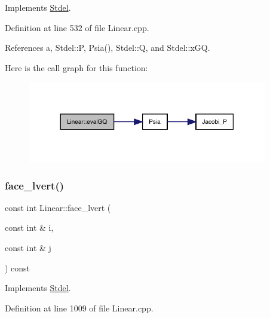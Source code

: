 Implements \hyperlink{classStdel_ae144597c3199b1757a5fbbc255e17baa}{Stdel}.



Definition at line 532 of file Linear.\+cpp.



References a, Stdel\+::P, Psia(), Stdel\+::Q, and Stdel\+::x\+GQ.

Here is the call graph for this function\+:
\nopagebreak
\begin{figure}[H]
\begin{center}
\leavevmode
\includegraphics[width=297pt]{classLinear_a6b7d2f6ffb9cef8e9f6a6f2a8365db60_cgraph}
\end{center}
\end{figure}
\mbox{\label{classLinear_ab27641b2d84128bc1cfaf87f40d5af45}} 
\subsubsection{\texorpdfstring{face\+\_\+lvert()}{face\_lvert()}}
{\footnotesize\ttfamily const int Linear\+::face\+\_\+lvert (\begin{DoxyParamCaption}\item[{const int \&}]{i,  }\item[{const int \&}]{j }\end{DoxyParamCaption}) const\hspace{0.3cm}{\ttfamily [virtual]}}



Implements \hyperlink{classStdel_a0df3b2fe6d87c6d0067d07ac2a2d3a32}{Stdel}.



Definition at line 1009 of file Linear.\+cpp.

\mbox{\label{classLinear_a7a27c4d5b5484419361a828ee0640d5d}} 

